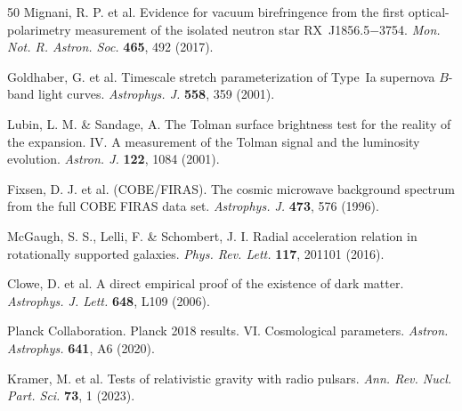 \documentclass[UTF8,fontset=none,11pt,a4paper]{ctexart}
\begin{document}
\begin{thebibliography}{50}
 Mignani, R. P. et al. Evidence for vacuum birefringence from the first
optical-polarimetry measurement of the isolated neutron star RX~J1856.5$-$3754. \emph{Mon. Not.
R. Astron. Soc.} \textbf{465}, 492 (2017).

 Goldhaber, G. et al. Timescale stretch parameterization of Type~Ia
supernova $B$-band light curves. \emph{Astrophys. J.} \textbf{558}, 359 (2001).

 Lubin, L. M. \& Sandage, A. The Tolman surface brightness test for the
reality of the expansion. IV. A measurement of the Tolman signal and the luminosity evolution.
\emph{Astron. J.} \textbf{122}, 1084 (2001).

 Fixsen, D. J. et al. (COBE/FIRAS). The cosmic microwave background spectrum
from the full COBE FIRAS data set. \emph{Astrophys. J.} \textbf{473}, 576 (1996).

 McGaugh, S. S., Lelli, F. \& Schombert, J. I. Radial acceleration relation
in rotationally supported galaxies. \emph{Phys. Rev. Lett.} \textbf{117}, 201101 (2016).

 Clowe, D. et al. A direct empirical proof of the existence of dark matter.
\emph{Astrophys. J. Lett.} \textbf{648}, L109 (2006).

 Planck Collaboration. Planck 2018 results. VI. Cosmological parameters.
\emph{Astron. Astrophys.} \textbf{641}, A6 (2020).

 Kramer, M. et al. Tests of relativistic gravity with radio pulsars.
\emph{Ann. Rev. Nucl. Part. Sci.} \textbf{73}, 1 (2023).

\end{thebibliography}
\end{document}
